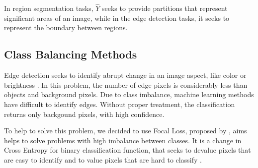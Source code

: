 
In region segmentation tasks, $\hat{Y}$ seeks to provide partitions that represent significant areas of an image, while in the edge detection tasks, it seeks to represent the boundary between regions.

\subsection{Class Balancing Methods}
\label{cap5_balanc_classes}

Edge detection seeks to identify abrupt change in an image aspect, like color or brightness \cite{MARTIN:1273918}.
In this problem, the number of edge pixels is considerably less than objects and background pixels.
Due to class imbalance, machine learning methods have difficult to identify edges.
Without proper treatment, the classification returns only backgound pixels, with high confidence.

To help to solve this problem, we decided to use Focal Loss, proposed by \cite{Lin:2017}, aims helps to solve problems with high imbalance between classes.
It is a change in Cross Entropy for binary classification function, that seeks to devalue pixels that are easy to identify and to value pixels that are hard to classify \cite{Lin:2017}.

